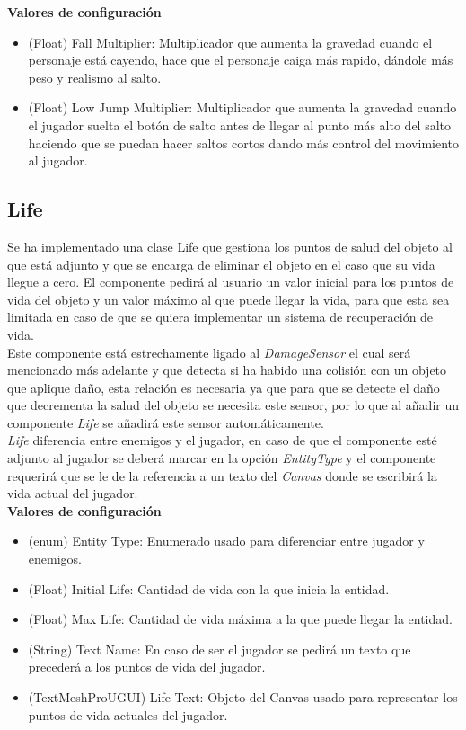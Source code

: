 \textbf{Valores de configuración}
\begin{itemize}
	\item (Float) Fall Multiplier: Multiplicador que aumenta la gravedad cuando el personaje está cayendo, hace que el personaje caiga más rapido, dándole más peso y realismo al salto.
	\item (Float) Low Jump Multiplier: Multiplicador que aumenta la gravedad cuando el jugador suelta el botón de salto antes de llegar al punto más alto del salto haciendo que se puedan hacer saltos cortos dando más control del movimiento al jugador.
\end{itemize}
\subsection{Life}

Se ha implementado una clase Life que gestiona los puntos de salud del objeto al que está adjunto y que se encarga de eliminar el objeto en el caso que su vida llegue a cero. El componente pedirá al usuario un valor inicial para los puntos de vida del objeto y un valor máximo al que puede llegar la vida, para que esta sea limitada en caso de que se quiera implementar un sistema de recuperación de vida.\\
Este componente está estrechamente ligado al \textit{DamageSensor} el cual será mencionado más adelante y que detecta si ha habido una colisión con un objeto que aplique daño, esta relación es necesaria ya que para que se detecte el daño que decrementa la salud del objeto se necesita este sensor, por lo que al añadir un componente \textit{Life} se añadirá este sensor automáticamente.\\
\textit{Life} diferencia entre enemigos y el jugador, en caso de que el componente esté adjunto al jugador se deberá marcar en la opción \textit{EntityType} y el componente requerirá que se le de la referencia a un texto del \textit{Canvas} donde se escribirá la vida actual del jugador.\\

\textbf{Valores de configuración}
\begin{itemize}
	\item (enum) Entity Type: Enumerado usado para diferenciar entre jugador y enemigos.
	\item (Float) Initial Life: Cantidad de vida con la que inicia la entidad.
	\item (Float) Max Life: Cantidad de vida máxima a la que puede llegar la entidad.
	\item (String) Text Name: En caso de ser el jugador se pedirá un texto que precederá a los puntos de vida del jugador.
	\item (TextMeshProUGUI) Life Text: Objeto del Canvas usado para representar los puntos de vida actuales del jugador.
\end{itemize}

